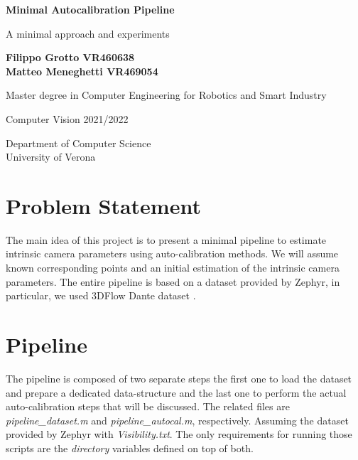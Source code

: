 \documentclass[11pt]{article}
\begin{document}
\begin{center} 
    \textbf{\LARGE Minimal Autocalibration Pipeline}

    \vspace{0.5cm}
    A minimal approach and experiments
            
    \vspace{1.5cm}

    \textbf{Filippo Grotto VR460638 \\ Matteo Meneghetti VR469054}

    \vspace{0.5cm}
    Master degree in Computer Engineering for Robotics and Smart Industry

    \vfill
            
    Computer Vision 2021/2022
            
    \vspace{0.8cm}
                
    Department of Computer Science\\
    University of Verona\\
            
\end{center}

\tableofcontents

\newpage
\section{Problem Statement}
The main idea of this project is to present a minimal pipeline to estimate intrinsic camera parameters using auto-calibration methods. We will assume known corresponding points and an initial estimation of the intrinsic camera parameters. The entire pipeline is based on a dataset provided by Zephyr, in particular, we used 3DFlow Dante dataset \cite{Dante}.

\section{Pipeline}
The pipeline is composed of two separate steps the first one to load the dataset and prepare a dedicated data-structure and the last one to perform the actual auto-calibration steps that will be discussed. The related files are \textit{pipeline\_dataset.m} and \textit{pipeline\_autocal.m}, respectively. Assuming the dataset provided by Zephyr with \textit{Visibility.txt}. The only requirements for running those scripts are the \textit{directory} variables defined on top of both.
\end{document}
